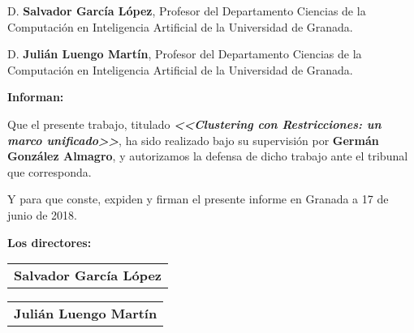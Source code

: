 
D. \textbf{Salvador García López}, Profesor del Departamento Ciencias de la Computación en Inteligencia Artificial de la Universidad de Granada.

\vspace{0.5cm}

D. \textbf{Julián Luengo Martín}, Profesor del Departamento Ciencias de la Computación en Inteligencia Artificial de la Universidad de Granada.


\vspace{0.5cm}

\textbf{Informan:}

\vspace{0.5cm}

Que el presente trabajo, titulado \textit{\textbf{<<Clustering con Restricciones: un marco unificado>>}},
ha sido realizado bajo su supervisión por \textbf{Germán González Almagro}, y autorizamos la defensa de dicho trabajo ante el tribunal
que corresponda.

\vspace{0.5cm}

Y para que conste, expiden y firman el presente informe en Granada a 17 de junio de 2018.

\vspace{1cm}

\textbf{Los directores:}

\vspace{5cm}


\begin{table}[H]
	\centering
	\begin{minipage}{.4\textwidth}
		\centering
		\begin{tabular}{c}
			\\ \hline 
			\textbf{Salvador García López}\\
		\end{tabular}
	\end{minipage}
	\hfill
	\begin{minipage}{.4\textwidth}
		\centering
		\begin{tabular}{c}
			\\ \hline 
			\textbf{Julián  Luengo Martín}\\
		\end{tabular}
	\end{minipage}
\end{table}




